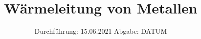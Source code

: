 

\subject{V204}
\title{Wärmeleitung von Metallen}
\date{%
  Durchführung: 15.06.2021
  \hspace{3em}
  Abgabe: DATUM
}



\maketitle
\thispagestyle{empty}
\tableofcontents
\newpage







\printbibliography{}



